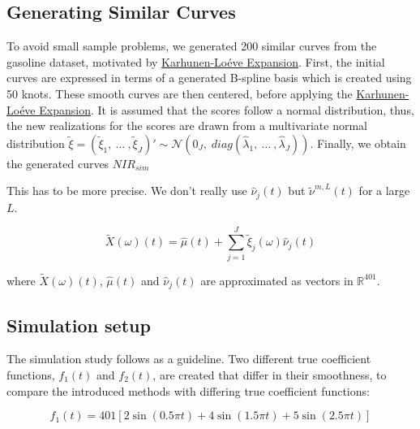 \documentclass[11pt,twoside,a4paper]{article}
\begin{document}
	
	\subsection{Generating Similar Curves}
	To avoid small sample problems, we generated 200 similar curves from the gasoline dataset, motivated by \hyperlink{KL}{Karhunen-Lo\'{e}ve Expansion}. First, the initial curves are expressed in terms of a generated B-spline basis which is created using 50 knots. These smooth curves are then centered, before applying the \hyperlink{KL}{Karhunen-Lo\'{e}ve Expansion}. It is assumed that the scores follow a normal distribution, thus, the new realizations for the scores are drawn from a multivariate normal distribution $\tilde{\xi} = \left(\tilde{\xi}_{1},\: \dots \:, \tilde{\xi}_{J}\right)' \sim \mathcal{N}(0_J, \; diag(\hat{\lambda}_1,\: \dots\:, \hat{\lambda}_J))$. Finally, we obtain the generated curves $NIR_{sim}$
	
	{\color{blue} This has to be more precise. We don't really use $\hat{\nu}_j(t)$ but $\tilde{\nu}^{m,L}(t)$ for a large $L$.}
	
	\begin{equation}
		\tilde{X}(\omega)(t) = \hat{\mu}(t) + \sum_{j = 1}^{J} \tilde{\xi}_j(\omega) \hat{\nu}_j(t)
	\end{equation}
	
	where $\tilde{X}(\omega)(t)$, $\hat{\mu}(t)$ and $\hat{\nu}_j(t)$ are approximated as vectors in $\mathbb{R}^{401}$.
    
    \subsection{Simulation setup}
	The simulation study follows \cite{Reiss_2007b} as a guideline. Two different true coefficient functions,  $f_1(t)$ and  $f_2(t)$, are created that differ in their smoothness, to compare the introduced methods with differing true coefficient functions:
	
	\begin{equation}
    	f_1(t) = 401 \left[ 2\sin(0.5\pi t) + 4\sin(1.5 \pi t) + 5\sin(2.5 \pi t) \right]
    \end{equation}
\end{document}
